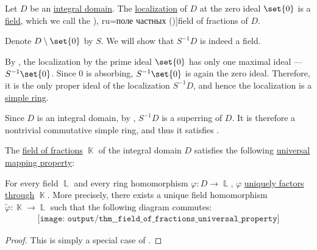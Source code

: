 \begin{proposition}\label{thm:field_of_fractions}
  Let \( D \) be an \hyperref[def:integral_domain]{integral domain}. The \hyperref[def:ring_localization]{localization} of \( D \) at the zero ideal \( \set{ 0 } \) is a \hyperref[def:field]{field}, which we call the \term[bg=поле от частни (\cite[def. V.16]{ГеновИПр1991Алгебра}), ru=поле частных (\cite[26]{Шафаревич1999Алгебра})]{field of fractions} of \( D \).
\end{proposition}
\begin{defproof}
  Denote \( D \setminus \set{ 0 } \) by \( S \). We will show that \( S^{-1} D \) is indeed a field.

  By , the localization by the prime ideal \( \set{ 0 } \) has only one maximal ideal --- \( S^{-1} \set{ 0 } \). Since \( 0 \) is absorbing, \( S^{-1} \set{ 0 } \) is again the zero ideal. Therefore, it is the only proper ideal of the localization \( S^{-1} D \), and hence the localization is a \hyperref[def:simple_object]{simple ring}.

  Since \( D \) is an integral domain, by , \( S^{-1} D \) is a superring of \( D \). It is therefore a nontrivial commutative simple ring, and thus it satisfies .
\end{defproof}

\begin{theorem}\label{thm:field_of_fractions_universal_property}
  The \hyperref[thm:field_of_fractions]{field of fractions} \( \BbbK \) of the integral domain \( D \) satisfies the following \hyperref[rem:universal_mapping_property]{universal mapping property}:
  \begin{displayquote}
    For every field \( \BbbL \) and every ring homomorphism \( \varphi: D \to \BbbL \), \( \varphi \) \hyperref[def:factors_through]{uniquely factors through} \( \BbbK \). More precisely, there exists a unique field homomorphism \( \widetilde{\varphi}: \BbbK \to \BbbL \) such that the following diagram commutes:
    \begin{equation}\label{eq:thm:field_of_fractions_universal_property/diagram}
      \begin{aligned}
        \texttt{[image: output/thm\_\_field\_of\_fractions\_universal\_property]}
      \end{aligned}
    \end{equation}
  \end{displayquote}
\end{theorem}
\begin{proof}
  This is simply a special case of .
\end{proof}

